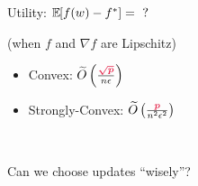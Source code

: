 \documentclass{beamer}
\begin{document}
\begin{frame}
  \Huge
  Utility: $\mathbb E_{} \hspace{-0.29em} \left[ f(w) - f^* \right] = \text{ ?}$

  \vspace{0.5em}

  {
    \begin{center}
      \huge   (when $f$ and $\nabla f$ are Lipschitz)
    \end{center}
  }

  \pause
  \vspace{1em}

  \begin{itemize}
  \item Convex: $\widetilde O\left( \frac{\emphcol{\sqrt{p}}}{n\epsilon} \right)$
  \item Strongly-Convex:  $\widetilde O\left( \frac{\emphcol{p}}{n^2\epsilon^2} \right)$
  \end{itemize}
\end{frame}


\begin{frame}
  ~
  \begin{center}
    \Huge
    Can we choose updates ``wisely''?
  \end{center}
\end{frame}
\end{document}
